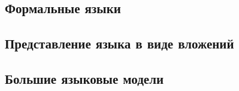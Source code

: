

\subsection{Формальные языки}


\subsection{Представление языка в виде вложений}


\subsection{Большие языковые модели}

